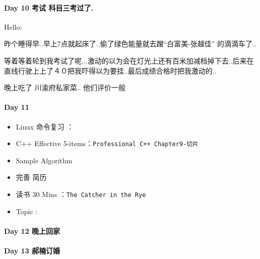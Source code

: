 \documentclass[UTF8,a4paper,8pt]{ctexart}
\begin{document}
 	 \paragraph{Day 10 考试 科目三考过了.  \quad     }Hello:
 	 
	 	 昨个睡得早..早上7点就起床了..偷了绿色能量就去蹭“白富美-张越佳” 的滴滴车了..
	 	 
	 	 等着等着轮到我考试了呢...激动的以为会在灯光上还有百米加减档掉下去..后来在直线行驶上上了４０把我吓得以为要挂..最后成绩合格时把我激动的..
	 	 
	 	 晚上吃了 川渝府私家菜.. 他们评价一般
 	 \paragraph{Day 11      \quad     }
	 	 \begin{itemize}[itemindent = 1em]
	 	 	\renewcommand\labelitemi{\makebox[0pt][l]{$\square$}\hspace{1em}} 
	 	 	\renewcommand\labelitemi{\makebox[0pt][l]{$\square$}\raisebox{.15ex}{\hspace{0.1em}$\checkmark$}}	 	
	 	 	\item   Linux 命令复习 ：
	 	 	\item   C++ Effective 5-items：\verb|Professional C++ Chapter9-切片|
	 	 	\item   Sample Algorithm
	 	 	\item   完善 简历
	 	 	
	 	 	\item   读书  30 Mins	：\verb|The Catcher in the Rye|	
	 	 	\renewcommand\labelitemi{\makebox[0pt][l]{$\square$}\hspace{1em}} 
	 	 	
	 	 	\renewcommand\labelitemi{\makebox[0pt][l]{$\square$}\raisebox{.15ex}{\hspace{0.1em}$\checkmark$}}
	 	 	\item   Topic : 
	 	 \end{itemize}
 	 \paragraph{Day 12 晚上回家     \quad     }
 	 \paragraph{Day 13 郝楠订婚     \quad     }
\end{document}
